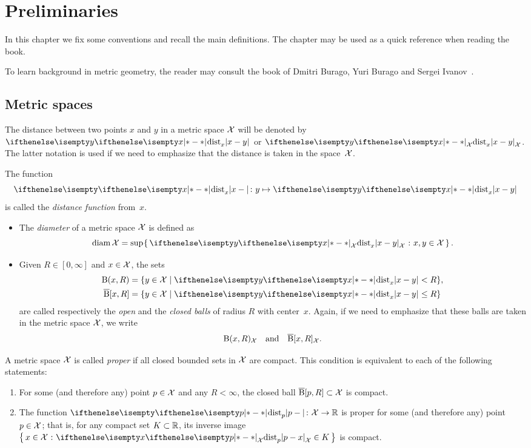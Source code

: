 \chapter{Preliminaries}\label{prelim}

In this chapter we fix some conventions and recall the main definitions.
The chapter may be used as a quick reference when reading the book.

To learn background in metric geometry, the reader  may consult the book of Dmitri Burago, Yuri Burago and Sergei Ivanov~\cite{BBI}.
 

\section{Metric spaces}
\label{sec:metric spaces}


The distance between two points $x$ and $y$ in a metric space $\mathcal{X}$ will be denoted by $\dist{x}{y}{}$ or $\dist{x}{y}{\spc{X}}$.
The latter notation is used if we need to emphasize 
that the distance is taken in the space~${\mathcal{X}}$.

The function 
\[\dist{x}{}{}\:y\mapsto \dist{x}{y}{}\]
is called the \emph{distance function} from~$x$. 

\begin{itemize}
\item The \emph{diameter} of a metric space $\mathcal{X}$ is defined as
\[\diam \spc{X}=\sup\set{\dist{x}{y}{\spc{X}}}{x,y\in \spc{X}}.\]

\item Given $R\in[0,\infty]$ and $x\in \spc{X}$, the sets
\begin{align*}
\oBall(x,R)&=\{y\in \spc{X}\mid \dist{x}{y}{}<R\},
\\
\cBall[x,R]&=\{y\in \spc{X}\mid \dist{x}{y}{}\le R\}
\end{align*}
are called respectively the  \emph{open} and  the \emph{closed  balls}   of radius $R$ with center~$x$.
Again, if we need to emphasize that these balls are taken in the metric space $\mathcal{X}$,
we write 
\[\mathrm{B}{}(x,R)_{\mathcal{X}}\quad\text{and}\quad\overline{\mathrm{B}}{}[x,R]_{\mathcal{X}}.\]
\end{itemize}

A metric space $\mathcal{X}$ is called \emph{proper} if all closed bounded sets in $\mathcal{X}$ are compact. 
This condition is equivalent to each of the following statements:
\begin{enumerate}
\item For some (and therefore any) point $p\in \spc{X}$ and any $R<\infty$, 
the closed ball $\cBall[p,R]\subset\spc{X}$ is compact. 
\item The function $\dist{p}{}{}\:\spc{X}\to\RR$ is proper for some (and therefore any) point $p\in \spc{X}$;
that is, for any compact set $K\subset \RR$, its inverse image 
$\set{x\in \spc{X}}{\dist{p}{x}{\spc{X}}\in K}$
is compact.
\end{enumerate}

